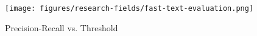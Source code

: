 \begin{figure}[t]
\centering
\texttt{[image: figures/research-fields/fast-text-evaluation.png]}
\caption{Precision-Recall vs. Threshold}
\label{fig:results_fasttext}
\end{figure}








